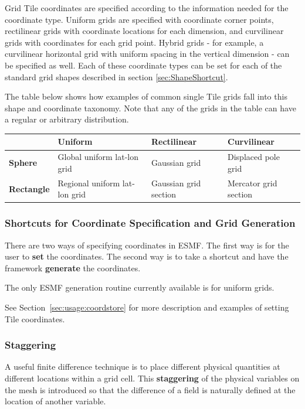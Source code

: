 Grid Tile coordinates are specified
according to the information needed for the coordinate type.
Uniform grids are specified with coordinate corner
points, rectilinear grids with coordinate locations for each dimension,
and curvilinear grids with coordinates for each grid point.  Hybrid
grids - for example, a curvilinear horizontal grid with uniform spacing
in the vertical dimension - can be specified as well.  Each of these
coordinate types can be set for each of the standard grid shapes
described in section \ref{sec:ShapeShortcut}.  

The table below shows how examples of common single Tile grids fall 
into this shape and coordinate taxonomy.  Note that any
of the grids in the table can have a regular or arbitrary distribution.

\medskip
\begin{tabular}{|p{.9in}|p{1.7in}|p{1.7in}|p{1.7in}|}
\hline
 & {\bf Uniform} & {\bf Rectilinear} & {\bf Curvilinear} \\ 
\hline
{\bf Sphere} & Global uniform lat-lon grid & Gaussian grid & Displaced pole grid \\
\hline
{\bf Rectangle} & Regional uniform lat-lon grid & Gaussian grid section & Mercator grid section\\
\hline
\end{tabular}

\subsubsection{Shortcuts for Coordinate Specification and Grid Generation}

There are two ways of specifying coordinates in ESMF.  The
first way is for the user to {\bf set} the coordinates.  The second 
way is to take a shortcut and have the framework {\bf generate}
the coordinates.  

The only ESMF generation routine currently available is for uniform grids.

See Section~\ref{sec:usage:coordstore} for more description and examples of
setting Tile coordinates.

\subsubsection{Staggering}

A useful finite difference technique is to place different physical
quantities at different locations within a grid cell. This {\bf staggering}
of the physical variables on the mesh is introduced so that the difference
of a field is naturally defined at the location of another variable. 

